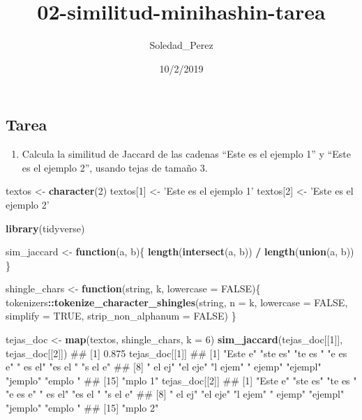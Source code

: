 \documentclass[]{article}
\title{02-similitud-minihashin-tarea}
\author{Soledad\_Perez}
\date{10/2/2019}
\newenvironment{Shaded}{\begin{snugshade}}{\end{snugshade}}
\newcommand{\KeywordTok}[1]{\textcolor[rgb]{0.13,0.29,0.53}{\textbf{#1}}}
\newcommand{\DataTypeTok}[1]{\textcolor[rgb]{0.13,0.29,0.53}{#1}}
\newcommand{\DecValTok}[1]{\textcolor[rgb]{0.00,0.00,0.81}{#1}}
\newcommand{\StringTok}[1]{\textcolor[rgb]{0.31,0.60,0.02}{#1}}
\newcommand{\OtherTok}[1]{\textcolor[rgb]{0.56,0.35,0.01}{#1}}
\newcommand{\ControlFlowTok}[1]{\textcolor[rgb]{0.13,0.29,0.53}{\textbf{#1}}}
\newcommand{\OperatorTok}[1]{\textcolor[rgb]{0.81,0.36,0.00}{\textbf{#1}}}
\newcommand{\NormalTok}[1]{#1}
\providecommand{\tightlist}{%
  \setlength{\itemsep}{0pt}\setlength{\parskip}{0pt}}
\begin{document}
\maketitle

\subsection*{Tarea}\label{tarea}

\begin{enumerate}
\def\labelenumi{\arabic{enumi}.}
\tightlist
\item
  Calcula la similitud de Jaccard de las cadenas ``Este es el ejemplo
  1'' y ``Este es el ejemplo 2'', usando tejas de tamaño \(3\).
\end{enumerate}

\begin{Shaded}
\begin{Highlighting}[]
\NormalTok{textos <-}\StringTok{ }\KeywordTok{character}\NormalTok{(}\DecValTok{2}\NormalTok{)}
\NormalTok{textos[}\DecValTok{1}\NormalTok{] <-}\StringTok{ 'Este es el ejemplo 1'}
\NormalTok{textos[}\DecValTok{2}\NormalTok{] <-}\StringTok{ 'Este es el ejemplo 2'}
\end{Highlighting}
\end{Shaded}

\begin{Shaded}
\begin{Highlighting}[]
\KeywordTok{library}\NormalTok{(tidyverse)}

\NormalTok{sim_jaccard <-}\StringTok{ }\ControlFlowTok{function}\NormalTok{(a, b)\{}
    \KeywordTok{length}\NormalTok{(}\KeywordTok{intersect}\NormalTok{(a, b)) }\OperatorTok{/}\StringTok{ }\KeywordTok{length}\NormalTok{(}\KeywordTok{union}\NormalTok{(a, b))}
\NormalTok{\}}

\NormalTok{shingle_chars <-}\StringTok{ }\ControlFlowTok{function}\NormalTok{(string, k, }\DataTypeTok{lowercase =} \OtherTok{FALSE}\NormalTok{)\{}
\NormalTok{    tokenizers}\OperatorTok{::}\KeywordTok{tokenize_character_shingles}\NormalTok{(string, }\DataTypeTok{n =}\NormalTok{ k, }\DataTypeTok{lowercase =} \OtherTok{FALSE}\NormalTok{,}
        \DataTypeTok{simplify =} \OtherTok{TRUE}\NormalTok{, }\DataTypeTok{strip_non_alphanum =} \OtherTok{FALSE}\NormalTok{)}
\NormalTok{\}}

\NormalTok{tejas_doc <-}\StringTok{ }\KeywordTok{map}\NormalTok{(textos, shingle_chars, }\DataTypeTok{k =} \DecValTok{6}\NormalTok{)}
\KeywordTok{sim_jaccard}\NormalTok{(tejas_doc[[}\DecValTok{1}\NormalTok{]], tejas_doc[[}\DecValTok{2}\NormalTok{]])}
\NormalTok{## [1] 0.875}
\NormalTok{tejas_doc[[}\DecValTok{1}\NormalTok{]]}
\NormalTok{##  [1] "Este e" "ste es" "te es " "e es e" " es el" "es el " "s el e"}
\NormalTok{##  [8] " el ej" "el eje" "l ejem" " ejemp" "ejempl" "jemplo" "emplo "}
\NormalTok{## [15] "mplo 1"}
\NormalTok{tejas_doc[[}\DecValTok{2}\NormalTok{]]}
\NormalTok{##  [1] "Este e" "ste es" "te es " "e es e" " es el" "es el " "s el e"}
\NormalTok{##  [8] " el ej" "el eje" "l ejem" " ejemp" "ejempl" "jemplo" "emplo "}
\NormalTok{## [15] "mplo 2"}
\end{Highlighting}
\end{Shaded}
\end{document}

